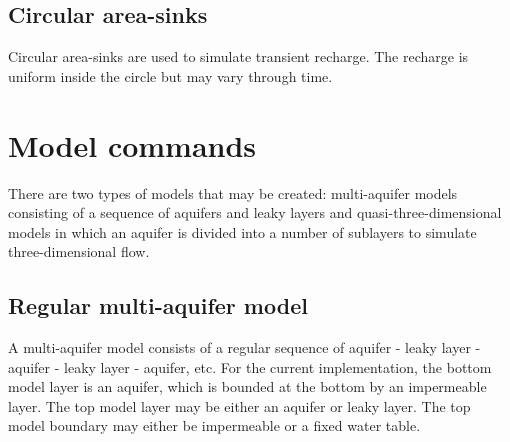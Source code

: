 \documentclass [10pt,letterpaper] {article}
\begin{document}
\subsection{Circular area-sinks}
Circular area-sinks are used to simulate transient recharge. The recharge is uniform inside the circle but may vary through time.

\section{Model commands}

There are two types of models that may be created: multi-aquifer models consisting of a sequence of aquifers and leaky layers and quasi-three-dimensional models in which an aquifer is divided into a number of sublayers to simulate three-dimensional flow.
\subsection{Regular multi-aquifer model}
A multi-aquifer model consists of a regular sequence of aquifer - leaky layer - aquifer - leaky layer - aquifer, etc. For the current implementation, the bottom model layer is an aquifer, which is bounded at the bottom by an impermeable layer. The top model layer may be either an aquifer or leaky layer. The top model boundary may either be impermeable or a fixed water table.
\end{document}
